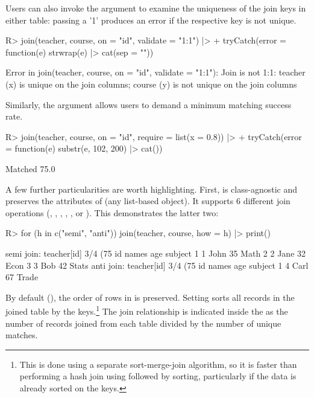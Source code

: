 \documentclass[article]{jss} %
\newcommand{\fct}[1]{\code{#1()}}
\begin{document}
Users can also invoke the  argument to examine the uniqueness of the join keys in either table: passing a '1' produces an error if the respective key is not unique.
%
\begin{Schunk}
\begin{Sinput}
R> join(teacher, course, on = "id", validate = "1:1") |>
+    tryCatch(error = function(e) strwrap(e) |> cat(sep = "\n"))
\end{Sinput}
\begin{Soutput}
Error in join(teacher, course, on = "id", validate = "1:1"): Join is
not 1:1: teacher (x) is unique on the join columns; course (y) is
not unique on the join columns
\end{Soutput}
\end{Schunk}
%
Similarly, the  argument allows users to demand a minimum matching success rate.
%
\begin{Schunk}
\begin{Sinput}
R> join(teacher, course, on = "id", require = list(x = 0.8)) |>
+    tryCatch(error = function(e) substr(e, 102, 200) |> cat())
\end{Sinput}
\begin{Soutput}
Matched 75.0% of records in table teacher (x), but 80.0% is required
\end{Soutput}
\end{Schunk}
%
A few further particularities are worth highlighting. First, \fct{join} is class-agnostic and preserves the attributes of  (any list-based object). It supports 6 different join operations (, , , , , or ). This demonstrates the latter two:
\begin{Schunk}
\begin{Sinput}
R> for (h in c("semi", "anti")) join(teacher, course, how = h) |> print()
\end{Sinput}
\begin{Soutput}
semi join: teacher[id] 3/4 (75%) <1:1st> course[id] 3/5 (60%)
  id names age subject
1  1  John  35    Math
2  2  Jane  32    Econ
3  3   Bob  42   Stats
anti join: teacher[id] 3/4 (75%) <1:1st> course[id] 3/5 (60%)
  id names age subject
1  4  Carl  67   Trade
\end{Soutput}
\end{Schunk}
By default (), the order of rows in  is preserved. Setting  sorts all records in the joined table by the keys.\footnote{This is done using a separate sort-merge-join algorithm, so it is faster than performing a hash join using \fct{fmatch} followed by sorting, particularly if the data is already sorted on the keys. } The join relationship is indicated inside the \code{<>} as the number of records joined from each table divided by the number of unique matches. %
\end{document}
